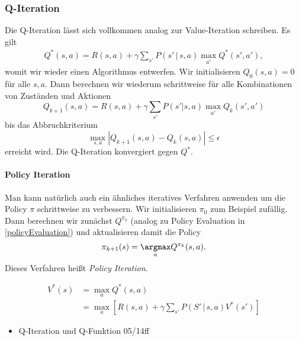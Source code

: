 \documentclass[ngerman]{../LaTeX-Templates/Paper/paper}
\begin{document}
\subsubsection{Q-Iteration}
Die Q-Iteration lässt sich vollkommen analog zur Value-Iteration schreiben. Es gilt 
\begin{align*}
	Q^\ast(s,a)=R(s,a)+\gamma\sum_{s'}P(s'\,|\,s,a)\max_{a'}Q^\ast (s',a'),
\end{align*}
womit wir wieder einen Algorithmus entwerfen.
Wir initialisieren $Q_0(s,a)=0$ für alle $s,a$.
Dann berechnen wir wiederum schrittweise für alle Kombinationen von Zuständen und Aktionen
\begin{equation*}
	Q_{k+1}(s,a)=R(s,a)+\gamma\sum_{s'}P(s'|s,a)\max_{a'}Q_{k}(s',a')
\end{equation*}
bis das Abbruchkriterium 
\begin{equation*}
	\max_{s,a}|Q_{k+1}(s,a)-Q_k(s,a)|\leq \epsilon
\end{equation*}
erreicht wird.
Die Q-Iteration konvergiert gegen $Q^\ast$.

\paragraph{Policy Iteration}
Man kann natürlich auch ein ähnliches iteratives Verfahren anwenden um die Policy $\pi$ schrittweise zu verbessern.
Wir initialisieren $\pi_0$ zum Beispiel zufällig.
Dann berechnen wir zunächst $Q^{\pi_k}$ (analog zu Policy Evaluation in \autoref{policyEvaluation}) und aktualisieren damit die Policy
\begin{equation*}
	\pi_{k+1}(s)=\underset a\argmax Q^{\pi_k}(s,a).
\end{equation*}
Dieses Verfahren heißt \emph{Policy Iteration}.







\begin{align*}
	V^\ast(s)&=\max_aQ^\ast(s,a)\\
	&=\max_a\left[R(s,a)+\gamma\sum_{s'}P(S'\,|\, s,a)V^\ast(s')\right]
\end{align*}



\begin{itemize}
	\item Q-Iteration und Q-Funktion 05/14ff
\end{itemize}
\end{document}
